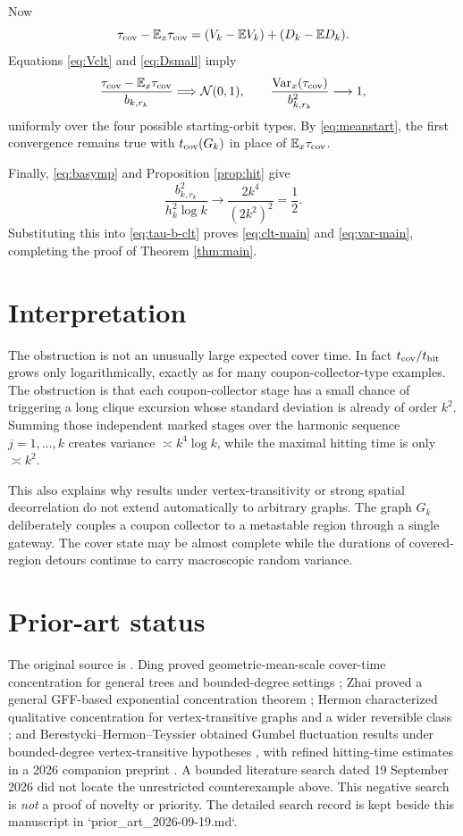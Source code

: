 \documentclass[11pt]{article}
\newcommand{\E}{\mathbb E}
\newcommand{\Var}{\operatorname{Var}}
\newcommand{\N}{\mathcal N}
\begin{document}
Now
\[
 \tau_{\rm cov}-\E_x\tau_{\rm cov}
 =(V_k-\E V_k)+(D_k-\E D_k).
\]
Equations \eqref{eq:Vclt} and \eqref{eq:Dsmall} imply
\begin{equation}\label{eq:tau-b-clt}
 \frac{\tau_{\rm cov}-\E_x\tau_{\rm cov}}{b_{k,r_k}}
 \Longrightarrow\N(0,1),
 \qquad
 \frac{\Var_x(\tau_{\rm cov})}{b_{k,r_k}^2}\longrightarrow1,
\end{equation}
uniformly over the four possible starting-orbit types.  By
\eqref{eq:meanstart}, the first convergence remains true with
$t_{\rm cov}(G_k)$ in place of $\E_x\tau_{\rm cov}$.

Finally, \eqref{eq:basymp} and Proposition \ref{prop:hit} give
\[
 \frac{b_{k,r_k}^2}{h_k^2\log k}
 \longrightarrow
 \frac{2k^4}{(2k^2)^2}
 =\frac12.
\]
Substituting this into \eqref{eq:tau-b-clt} proves
\eqref{eq:clt-main} and \eqref{eq:var-main}, completing the proof of
Theorem \ref{thm:main}.

\section{Interpretation}

The obstruction is not an unusually large expected cover time.  In fact
$t_{\rm cov}/t_{\rm hit}$ grows only logarithmically, exactly as for many
coupon-collector-type examples.  The obstruction is that each coupon-collector
stage has a small chance of triggering a long clique excursion whose standard
deviation is already of order $k^2$.  Summing those independent marked stages
over the harmonic sequence $j=1,\dots,k$ creates variance
$\asymp k^4\log k$, while the maximal hitting time is only $\asymp k^2$.

This also explains why results under vertex-transitivity or strong spatial
decorrelation do not extend automatically to arbitrary graphs.  The graph
$G_k$ deliberately couples a coupon collector to a metastable region through a
single gateway.  The cover state may be almost complete while the durations of
covered-region detours continue to carry macroscopic random variance.

\section*{Prior-art status}

The original source is \cite{DLP}.  Ding proved geometric-mean-scale cover-time
concentration for general trees and bounded-degree settings \cite{Ding}; Zhai
proved a general GFF-based exponential concentration theorem \cite{Zhai};
Hermon characterized qualitative concentration for vertex-transitive graphs
and a wider reversible class \cite{Hermon}; and Berestycki--Hermon--Teyssier
obtained Gumbel fluctuation results under bounded-degree vertex-transitive
hypotheses \cite{BHT}, with refined hitting-time estimates in a 2026 companion
preprint \cite{BHT26}.  A bounded literature search dated 19 September 2026
did not locate the unrestricted counterexample above.  This negative search is
\emph{not} a proof of novelty or priority.  The detailed search record is kept
beside this manuscript in `prior_art_2026-09-19.md`.
\end{document}
